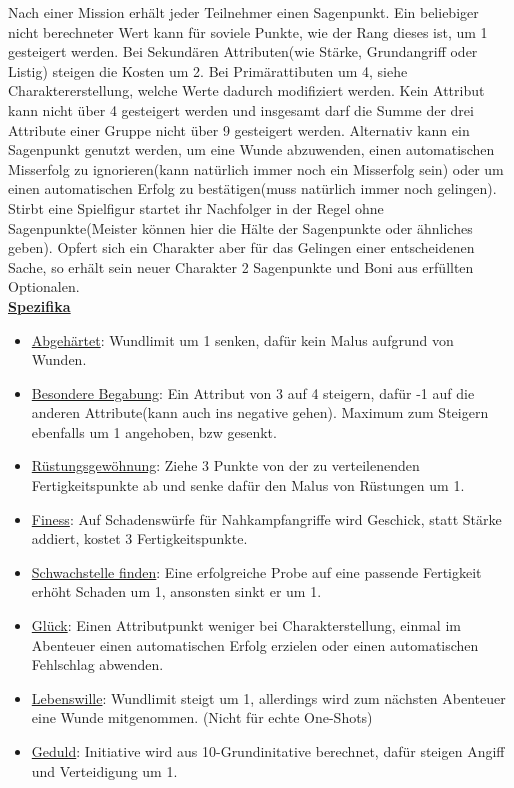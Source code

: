 \documentclass[twoside,a4paper]{minimal}
\begin{document}
\begin{multicols*}{3}
Nach einer Mission erhält jeder Teilnehmer einen Sagenpunkt. Ein beliebiger nicht berechneter Wert kann für soviele Punkte, wie der Rang dieses ist, um 1 gesteigert werden. Bei Sekundären Attributen(wie Stärke, Grundangriff oder Listig) steigen die Kosten um 2. Bei Primärattibuten um 4, siehe Charaktererstellung, welche Werte dadurch modifiziert werden. Kein Attribut kann nicht über 4 gesteigert werden und insgesamt darf die Summe der drei Attribute einer Gruppe nicht über 9 gesteigert werden. Alternativ kann ein Sagenpunkt genutzt werden, um eine Wunde abzuwenden, einen automatischen Misserfolg zu ignorieren(kann natürlich immer noch ein Misserfolg sein) oder um einen automatischen Erfolg zu bestätigen(muss natürlich immer noch gelingen). Stirbt eine Spielfigur startet ihr Nachfolger in der Regel ohne Sagenpunkte(Meister können hier die Hälte der Sagenpunkte oder ähnliches geben). Opfert sich ein Charakter aber für das Gelingen einer entscheidenen Sache, so erhält sein neuer Charakter 2 Sagenpunkte und Boni aus erfüllten Optionalen. 
\textbf{\uline{\\Spezifika}}
\begin{itemize}
\item \uline{Abgehärtet}: Wundlimit um 1 senken, dafür kein Malus aufgrund von Wunden.
\item \uline{Besondere Begabung}: Ein Attribut von 3 auf 4 steigern, dafür -1 auf die anderen Attribute(kann auch ins negative gehen). Maximum zum Steigern ebenfalls um 1 angehoben, bzw gesenkt.
\item \uline{Rüstungsgewöhnung}: Ziehe 3 Punkte von der zu verteilenenden Fertigkeitspunkte ab und senke dafür den Malus von Rüstungen um 1.
\item \uline{Finess}: Auf Schadenswürfe für Nahkampfangriffe wird Geschick, statt Stärke addiert, kostet 3 Fertigkeitspunkte.
\item \uline{Schwachstelle finden}: Eine erfolgreiche Probe auf eine passende Fertigkeit erhöht Schaden um 1, ansonsten sinkt er um 1.
\item \uline{Glück}: Einen Attributpunkt weniger bei Charakterstellung, einmal im Abenteuer einen automatischen Erfolg erzielen oder einen automatischen Fehlschlag abwenden.
\item \uline{Lebenswille}: Wundlimit steigt um 1, allerdings wird zum nächsten Abenteuer eine Wunde mitgenommen. (Nicht für echte One-Shots)
\item \uline{Geduld}: Initiative wird aus 10-Grundinitative berechnet, dafür steigen Angiff und Verteidigung um 1. 

\end{itemize}
\end{multicols*}
\end{document}
